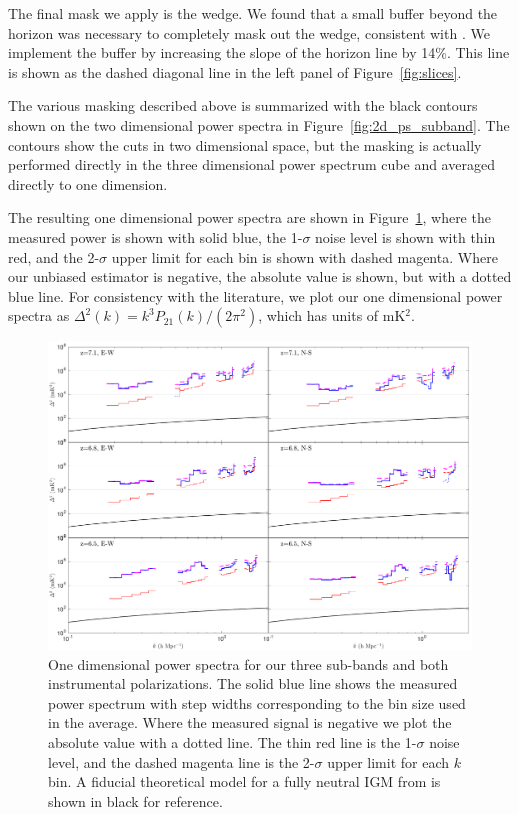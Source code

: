 \documentclass[iop]{emulateapj}
\begin{document}
The final mask we apply is the wedge. We found that a small buffer beyond the horizon was
necessary to completely mask out the wedge, consistent with \citealt{Dillon:2015}. We
implement the buffer by increasing the slope of the horizon line by 14\%.
This line is shown as the
dashed diagonal line in the left panel of Figure~\ref{fig:slices}.

The various masking described above is summarized with the black contours shown on the
two dimensional power spectra in Figure~\ref{fig:2d_ps_subband}. The contours show
the cuts in two dimensional space, but the masking is actually performed directly in the
three dimensional power spectrum cube and averaged directly to one dimension.

The resulting one dimensional power spectra are shown in Figure~\ref{fig:1d_ps}, where 
the measured power is shown with solid blue, the 1-$\sigma$ noise level is shown with 
thin red, and the 2-$\sigma$ upper limit for each bin is shown with dashed magenta. 
Where our unbiased estimator is negative, the absolute value is shown, but with a dotted 
blue line. For consistency with the literature, we plot our one dimensional power spectra 
as $\Delta^2(k)=k^3P_{21}(k)/(2\pi^2)$, which has units of mK$^2$.

\begin{figure}
\begin{center}
\includegraphics[width=\textwidth]{1D_spectra.pdf}
\caption[1D deep power spectra]{
One dimensional power spectra for our three sub-bands and both instrumental 
polarizations. The solid blue line shows the measured power spectrum with step widths 
corresponding to the bin size used in the average. Where the measured signal is negative 
we plot the absolute value with a dotted line. The thin red line is the 1-$\sigma$ noise level, and 
the dashed magenta line is the 2-$\sigma$ upper limit for each $k$ bin. 
A fiducial theoretical model for a fully neutral IGM from \citet{Furlanetto:2006} is shown
in black for reference.
\label{fig:1d_ps}
}
\end{center}
\end{figure}
\end{document}
